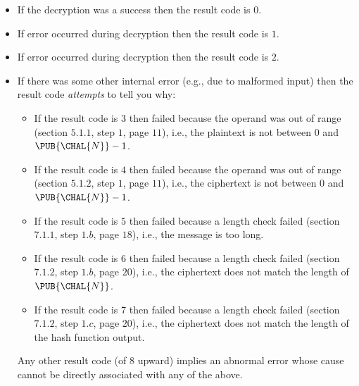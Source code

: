 \documentclass[crop={false},multi={true},tikz={true}]{standalone}
\begin{document}
\begin{itemize}
\item If the decryption was a success                   
      then the result code is $0$.
\item If error  occurred during decryption 
      then the result code is $1$.
\item If error  occurred during decryption 
      then the result code is $2$.
\item If there was some other internal error (e.g., due to malformed input)
      then the result code {\em attempts} to tell you why: 

      \begin{itemize}
      \item If the result code is $3$ then               
            failed because the operand was out of range 
            (section $5.1.1$, step $1$, page $11$), 
            i.e., the  plaintext is not between $0$ and $\PUB{\CHAL{N}}-1$.
      \item If the result code is $4$ then               
            failed because the operand was out of range 
            (section $5.1.2$, step $1$, page $11$), 
            i.e., the ciphertext is not between $0$ and $\PUB{\CHAL{N}}-1$.
      \item If the result code is $5$ then  
            failed because a length check failed        
            (section $7.1.1$, step $1.b$, page $18$), 
            i.e., the message is too long.
      \item If the result code is $6$ then  
            failed because a length check failed        
            (section $7.1.2$, step $1.b$, page $20$), 
            i.e., the ciphertext does not match the length of $\PUB{\CHAL{N}}$.
      \item If the result code is $7$ then  
            failed because a length check failed        
            (section $7.1.2$, step $1.c$, page $20$), 
            i.e., the ciphertext does not match the length of the hash function output.
      \end{itemize}

      \noindent
      Any other result code (of $8$ upward) implies an abnormal error whose
      cause cannot be directly associated with any of the above.
\end{itemize}

\end{document}
